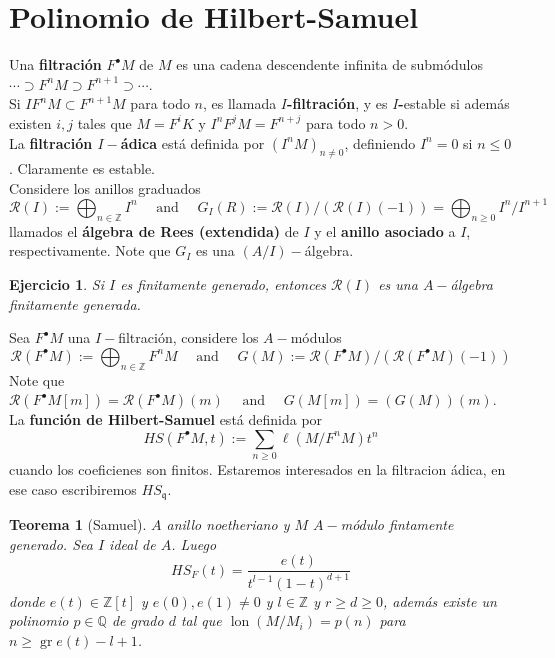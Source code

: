 \documentclass[12pt]{book}
\newtheorem{teo}{Teorema}
\newtheorem{ex}{Ejercicio}
\newcommand{\z}{\mathbb{Z}}
\newcommand{\lon}{\operatorname{lon}}
\newcommand{\qq}{\mathfrak{q}}
\newcommand{\gr}{\operatorname{gr}}
\begin{document}
\section{Polinomio de Hilbert-Samuel}

Una \textbf{filtración} $F^\bullet M$ de $M$ es una cadena descendente infinita de submódulos $ \cdots \supset F^n M \supset F^{n+1} \supset \cdots $.\\
Si $I F^n M \subset F^{n+1}M$ para todo $n$, es llamada \textbf{$I$-filtración}, y es \textbf{$I$-}estable si además existen $i,j$ tales que $M= F^i K$ y $I^n F^j M = F^{n+j}$ para todo $n>0$.\\

La \textbf{filtración $I-$ádica} está definida por $ (I^n M)_{n\neq 0}$, definiendo $I^n=0$ si $ n \leq0$. Claramente es estable.\\
Considere los anillos graduados $$
\mathcal{R}(I):=\bigoplus_{n \in \mathbb{Z}} I^{n} \quad \text { and } \quad G_{I}(R) :=\mathcal{R}(I) /(\mathcal{R}(I)(-1)) = \bigoplus _{n \geq 0} I ^n / I^{n+1}
$$ llamados el \textbf{álgebra de Rees (extendida)} de $I$ y el \textbf{anillo asociado} a $I$, respectivamente. Note que $G_I$ es una $(A/ I)-$álgebra. 

\begin{ex}
Si $I$ es finitamente generado, entonces $\mathcal{R}(I)$ es una $A-$álgebra finitamente generada.
\end{ex}

Sea $F^\bullet M$ una $I-$filtración, considere los $A-$módulos $$
\mathcal{R}\left(F^{\bullet} M\right):=\bigoplus_{n \in \mathbb{Z}} F^{n} M \quad \text { and } \quad G(M):=\mathcal{R}\left(F^{\bullet} M\right) /\left(\mathcal{R}\left(F^{\bullet} M\right)(-1)\right)
$$
Note que $
\mathcal{R}\left(F^{\bullet} M[m]\right)=\mathcal{R}\left(F^{\bullet} M\right)(m) \quad \text { and } \quad G(M[m])=(G(M))(m)
$.\\

La \textbf{función de Hilbert-Samuel} está definida por $$
HS\left(F^{\bullet} M, t\right):=\sum_{n \geq 0} \ell\left(M / F^{n} M\right) t^{n}
$$ cuando los coeficienes son finitos. Estaremos interesados en la filtracion ádica, en ese caso escribiremos $ HS_\qq$.

\begin{teo}[Samuel]
$A$ anillo noetheriano y $M$ $A-$módulo fintamente generado. Sea $I$ ideal de $A$. Luego $$HS_F (t) = \frac{e(t)}{t^{l-1} (1-t)^{d+1}} $$ donde $e(t) \in\z[t]$ y $ e(0), e(1) \neq 0$ y $ l \in \z $ y $r \geq d\geq 0$, además existe un polinomio $p \in \mathbb{Q}$ de grado $d$ tal que $ \lon (M / M_i) = p (n)$ para $n\geq \gr e(t) -l+1$.
\end{teo}
\end{document}
